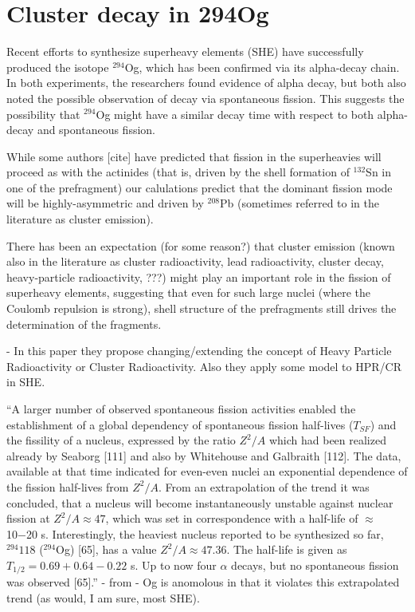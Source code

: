 \chapter{Cluster decay in 294Og}\label{chap:294Og}

\maketitle

Recent efforts to synthesize superheavy elements (SHE) have successfully produced the isotope $^{294}$Og, which has been confirmed via its alpha-decay chain. In both experiments, the researchers found evidence of alpha decay, but both also noted the possible observation of decay via spontaneous fission. This suggests the possibility that $^{294}$Og might have a similar decay time with respect to both alpha-decay and spontaneous fission.

While some authors [cite] have predicted that fission in the superheavies will proceed as with the actinides (that is, driven by the shell formation of $^{132}$Sn in one of the prefragment) our calulations predict that the dominant fission mode will be highly-asymmetric and driven by $^{208}$Pb (sometimes referred to in the literature as cluster emission).

There has been an expectation (for some reason?) that cluster emission (known also in the literature as cluster radioactivity, lead radioactivity, cluster decay, heavy-particle radioactivity, ???) might play an important role in the fission of superheavy elements, suggesting that even for such large nuclei (where the Coulomb repulsion is strong), shell structure of the prefragments still drives the determination of the fragments.

\cite{Poenaru2011, Poenaru2012} - In this paper they propose changing/extending the concept of Heavy Particle Radioactivity or Cluster Radioactivity. Also they apply some model to HPR/CR in SHE.

``A larger number of observed spontaneous fission activities enabled the establishment of a global dependency of spontaneous fission half-lives ($T_{SF}$) and the fissility of a nucleus, expressed by the ratio $Z^2/A$ which had been realized already by Seaborg [111] and also by Whitehouse and Galbraith [112]. The data, available at that time indicated for even-even nuclei an exponential dependence of the fission half-lives from $Z^2/A$. From an extrapolation of the trend it was concluded, that a nucleus will become instantaneously unstable against nuclear fission at $Z^2/A \approx 47$, which was set in correspondence with a half-life of $\approx$ 10−20 s. Interestingly, the heaviest nucleus reported to be synthesized so far, $^{294}118$ ($^{294}$Og) [65], has a value $Z^2/A \approx 47.36$. The half-life is given as $T_{1/2} =0.69+0.64−0.22$ s. Up to now four $\alpha$ decays, but no spontaneous fission was observed [65].'' - from \cite{Heßberger2017} - Og is anomolous in that it violates this extrapolated trend (as would, I am sure, most SHE).

